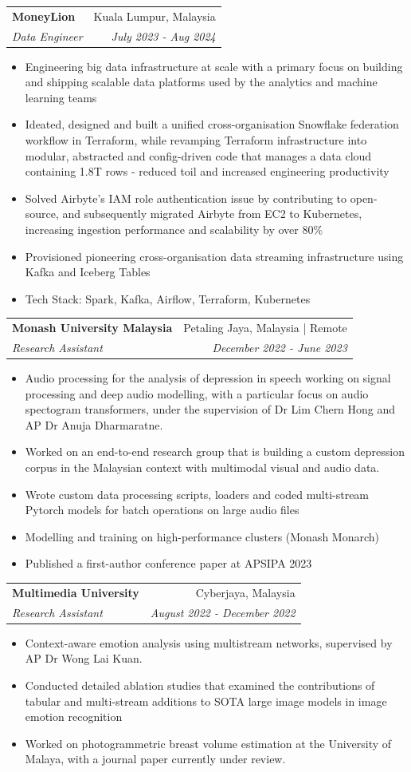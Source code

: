 \documentclass[letterpaper,11pt]{article}
\makeatletter
\newcommand{\resumeItem}[1]{
  \item{
    {#1 \vspace{-2pt}}
  }
}
\newcommand{\resumeSubheading}[4]{
  \vspace{-1pt}\item
    \begin{tabular*}{0.97\textwidth}[t]{l@{\extracolsep{\fill}}r}
      \textbf{#1} & \small{#2} \\
      \textit{#3} & \textit{#4} \\
    \end{tabular*}\vspace{-6pt}
}
\newcommand{\resumeItemListStart}{\begin{itemize}}
\newcommand{\resumeItemListEnd}{\end{itemize}\vspace{-5pt}}
\makeatother
\begin{document}
  \resumeSubheading
  {MoneyLion}{Kuala Lumpur, Malaysia}
  {\textit{Data Engineer}}{July 2023 - Aug 2024}
  \resumeItemListStart
    \resumeItem{Engineering big data infrastructure at scale with a primary focus on building and shipping scalable data platforms used by the analytics and machine learning teams}
    \resumeItem{Ideated, designed and built a unified cross-organisation Snowflake federation workflow in Terraform, while revamping Terraform infrastructure into modular, abstracted and config-driven code that manages a data cloud containing 1.8T rows - reduced toil and increased engineering productivity}
    \resumeItem{Solved Airbyte's IAM role authentication issue by contributing to open-source, and subsequently migrated Airbyte from EC2 to Kubernetes, increasing ingestion performance and scalability by over 80\%}
    \resumeItem{Provisioned pioneering cross-organisation data streaming infrastructure using Kafka and Iceberg Tables}
    \resumeItem{Tech Stack: Spark, Kafka, Airflow, Terraform, Kubernetes}
  \resumeItemListEnd
 
  \resumeSubheading
  {Monash University Malaysia}{Petaling Jaya, Malaysia | Remote}
  {\textit{Research Assistant}}{December 2022 - June 2023}
  \resumeItemListStart
    \resumeItem{Audio processing for the analysis of depression in speech working on signal processing and deep audio modelling, with a particular focus on audio spectogram transformers, under the supervision of Dr Lim Chern Hong and AP Dr Anuja Dharmaratne.}
    \resumeItem{Worked on an end-to-end research group that is building a custom depression corpus in the Malaysian context with multimodal visual and audio data.}
    \resumeItem{Wrote custom data processing scripts, loaders and coded multi-stream Pytorch models for batch operations on large audio files}
    \resumeItem{Modelling and training on high-performance clusters (Monash Monarch)}
    \resumeItem{Published a first-author conference paper at APSIPA 2023}
  \resumeItemListEnd

  \resumeSubheading
  {Multimedia University}{Cyberjaya, Malaysia}
  {\textit{Research Assistant}}{August 2022 - December 2022}
  \resumeItemListStart
    \resumeItem{Context-aware emotion analysis using multistream networks, supervised by AP Dr Wong Lai Kuan.}
    \resumeItem{Conducted detailed ablation studies that examined the contributions of tabular and multi-stream additions to SOTA large image models in image emotion recognition}
    \resumeItem{Worked on photogrammetric breast volume estimation at the University of Malaya, with a journal paper currently under review.}
  \resumeItemListEnd
\end{document}
